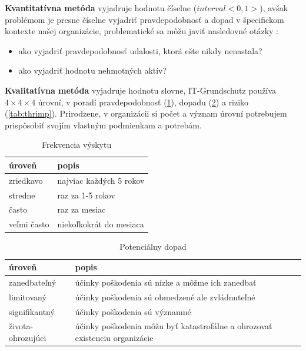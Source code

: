 \textbf{Kvantitatívna metóda} vyjadruje hodnotu číselne ($interval <0,1>$), avšak problémom je presne číselne vyjadriť pravdepodobnosť a dopad
v špecifickom kontexte našej organizácie, problematické sa môžu javiť nasledovné otázky \cite{MFSRIB}:
\begin{itemize}[nosep]
    \item ako vyjadriť pravdepodobnosť udalosti, ktorá ešte nikdy nenastala?
    \item ako vyjadriť hodnotu nehmotných aktív?
\end{itemize}

\textbf{Kvalitatívna metóda} vyjadruje hodnotu slovne, IT-Grundschutz používa $4 \times 4 \times 4$ úrovní, v poradí pravdepodobnosť
(\ref{tab:thrfreq}), dopadu (\ref{tab:thrdmg}) a riziko (\ref{tab:thrimp}). Prirodzene, v organizácii si počet a význam úrovní potrebujem
prispôsobiť svojím vlastným podmienkam a potrebám. 
\begin{table}[!h]
    \caption{Frekvencia výskytu}
    \label{tab:thrfreq}
    \begin{center}
        \footnotesize
        \begin{tabularx}{\textwidth}{|X|X|}
        \hline
        úroveň & popis \\
        \hline
        \hline
        zriedkavo & najviac každých 5 rokov \\
        \hline
        stredne & raz za 1-5 rokov \\
        \hline
        často & raz za mesiac \\
        \hline
        veľmi často & niekoľkokrát do mesiaca  \\
        \hline
        \end{tabularx}
    \end{center}
\end{table}

\begin{table}[!h]
    \caption{Potenciálny dopad}
    \label{tab:thrdmg}
    \begin{center}
        \footnotesize
        \begin{tabularx}{\textwidth}{|X|X|}
        \hline
        úroveň & popis \\
        \hline
        \hline
        zanedbateľný & účinky poškodenia sú nízke a môžme ich zanedbať  \\
        \hline
        limitovaný & účinky poškodenia sú obmedzené ale zvládnuteľné \\
        \hline
        signifikantný & účinky poškodenia sú významné  \\
        \hline
        života-ohrozujúci & účinky poškodenia môžu byť katastrofálne a ohrozovať existenciu organizácie \\
        \hline
        \end{tabularx}
    \end{center}
\end{table}

